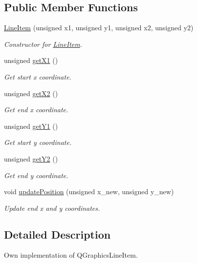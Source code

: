 \subsection*{Public Member Functions}
\begin{DoxyCompactItemize}
\item 
\mbox{\hyperlink{classLineItem_af79b99800cc44a69b53940bdb88ddd1b}{Line\+Item}} (unsigned x1, unsigned y1, unsigned x2, unsigned y2)
\begin{DoxyCompactList}\small\item\em Constructor for \mbox{\hyperlink{classLineItem}{Line\+Item}}. \end{DoxyCompactList}\item 
unsigned \mbox{\hyperlink{classLineItem_a8862ea60a3804d346e9801f79c67af76}{get\+X1}} ()
\begin{DoxyCompactList}\small\item\em Get start x coordinate. \end{DoxyCompactList}\item 
unsigned \mbox{\hyperlink{classLineItem_addce0ef5af72c233e2c7bf019c7a693d}{get\+X2}} ()
\begin{DoxyCompactList}\small\item\em Get end x coordinate. \end{DoxyCompactList}\item 
unsigned \mbox{\hyperlink{classLineItem_abbdf5be2637561802ea22385c7c11df5}{get\+Y1}} ()
\begin{DoxyCompactList}\small\item\em Get start y coordinate. \end{DoxyCompactList}\item 
unsigned \mbox{\hyperlink{classLineItem_aa99afab282d1e7e25b5d1549a41984d2}{get\+Y2}} ()
\begin{DoxyCompactList}\small\item\em Get end y coordinate. \end{DoxyCompactList}\item 
void \mbox{\hyperlink{classLineItem_acea090c7b9ff53dcc7a95ab7939b2cb9}{update\+Position}} (unsigned x\+\_\+new, unsigned y\+\_\+new)
\begin{DoxyCompactList}\small\item\em Update end x and y coordinates. \end{DoxyCompactList}\end{DoxyCompactItemize}


\subsection{Detailed Description}
Own implementation of Q\+Graphics\+Line\+Item. 

